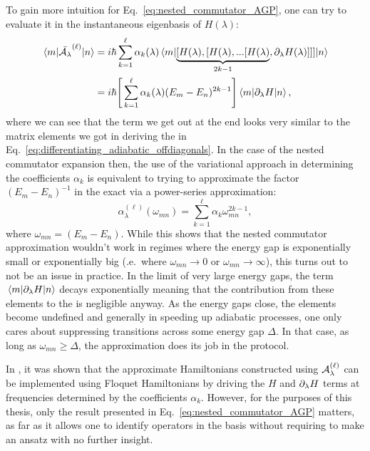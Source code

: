     To gain more intuition for Eq.~\eqref{eq:nested_commutator_AGP}, one can try to evaluate it in the instantaneous eigenbasis of $H(\lambda)$:
    \begin{equation}\label{eq:nested_commutator_matrix_elements}
        \begin{aligned}
            \mel*{m}{\Bar{\mathcal{A}_{\lambda}}^{(\ell)}}{n} &= i\hbar \sum_{k=1}^\ell \alpha_k(\lambda) \mel*{m}{\underbrace{[H(\lambda),[H(\lambda),...[H(\lambda)}_{2k-1},\partial_{\lambda} H(\lambda)]]]}{n} \\
            &= i\hbar \Bigg[ \sum_{k=1}^\ell \alpha_k(\lambda)(E_m - E_n)^{2k - 1} \Bigg] \mel{m}{\partial_{\lambda}H}{n},
        \end{aligned}
    \end{equation}
    where we can see that the term we get out at the end looks very similar to the matrix elements we got in deriving the  in Eq.~\eqref{eq:differentiating_adiabatic_offdiagonals}. In the case of the nested commutator expansion then, the use of the variational  approach in determining the coefficients $\alpha_k$ is equivalent to trying to approximate the factor $(E_m - E_n)^{- 1}$ in the exact  via a power-series approximation:
    \begin{equation}
        \alpha_{\lambda}^{(\ell)}(\omega_{mn}) = \sum_{k=1}^\ell \alpha_k \omega_{mn}^{2k - 1},
    \end{equation}
    where $\omega_{mn} = (E_m - E_n)$. While this shows that the nested commutator approximation wouldn't work in regimes where the energy gap is exponentially small or exponentially big (\@i.e.~where $\omega_{mn} \rightarrow 0$ or $\omega_{mn} \rightarrow \infty$), this turns out to not be an issue in practice. In the limit of very large energy gaps, the term $\mel{m}{\partial_{\lambda}H}{n}$ decays exponentially meaning that the contribution from these elements to the  is negligible anyway. As the energy gaps close, the  elements become undefined and generally in speeding up adiabatic processes, one only cares about suppressing transitions across some energy gap $\Delta$. In that case, as long as $\omega_{mn} \geq \Delta$, the approximation does its job in the  protocol.

    In \cite{claeys_floquet-engineering_2019}, it was shown that the approximate  Hamiltonians constructed using $\mathcal{A}_{\lambda}^{(\ell)}$ can be implemented using Floquet Hamiltonians \cite{goldman_periodically_2014} by driving the $H$ and $\partial_{\lambda} H$ terms at frequencies determined by the coefficients $\alpha_k$. However, for the purposes of this thesis, only the result presented in Eq.~\eqref{eq:nested_commutator_AGP} matters, as far as it allows one to identify operators in the  basis without requiring to make an ansatz with no further insight.